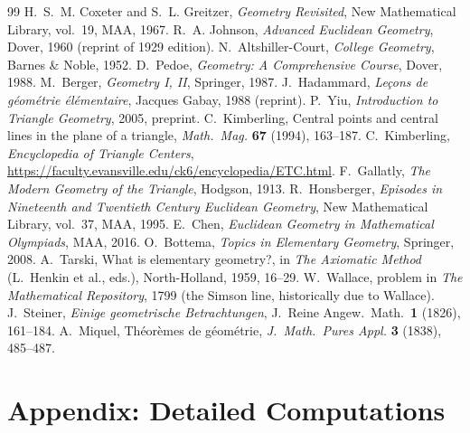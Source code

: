\documentclass[11pt,a4paper]{article}
\theoremstyle{definition}
\begin{document}
\begin{thebibliography}{99}
 H.~S.~M. Coxeter and S.~L. Greitzer, \emph{Geometry Revisited}, New Mathematical Library, vol.~19, MAA, 1967.
 R.~A. Johnson, \emph{Advanced Euclidean Geometry}, Dover, 1960 (reprint of 1929 edition).
 N.~Altshiller-Court, \emph{College Geometry}, Barnes \& Noble, 1952.
 D.~Pedoe, \emph{Geometry: A Comprehensive Course}, Dover, 1988.
 M.~Berger, \emph{Geometry I, II}, Springer, 1987.
 J.~Hadammard, \emph{Le\c{c}ons de g\'eom\'etrie \'el\'ementaire}, Jacques Gabay, 1988 (reprint).
 P.~Yiu, \emph{Introduction to Triangle Geometry}, 2005, preprint.
 C.~Kimberling, Central points and central lines in the plane of a triangle, \emph{Math.\ Mag.} \textbf{67} (1994), 163--187.
 C.~Kimberling, \emph{Encyclopedia of Triangle Centers}, \url{https://faculty.evansville.edu/ck6/encyclopedia/ETC.html}.
 F.~Gallatly, \emph{The Modern Geometry of the Triangle}, Hodgson, 1913.
 R.~Honsberger, \emph{Episodes in Nineteenth and Twentieth Century Euclidean Geometry}, New Mathematical Library, vol.~37, MAA, 1995.
 E.~Chen, \emph{Euclidean Geometry in Mathematical Olympiads}, MAA, 2016.
 O.~Bottema, \emph{Topics in Elementary Geometry}, Springer, 2008.
 A.~Tarski, What is elementary geometry?, in \emph{The Axiomatic Method} (L.~Henkin et al., eds.), North-Holland, 1959, 16--29.
 W.~Wallace, problem in \emph{The Mathematical Repository}, 1799 (the Simson line, historically due to Wallace).
 J.~Steiner, \emph{Einige geometrische Betrachtungen}, J.~Reine Angew.\ Math.\ \textbf{1} (1826), 161--184.
 A.~Miquel, Th\'eor\`emes de g\'eom\'etrie, \emph{J.~Math.\ Pures Appl.} \textbf{3} (1838), 485--487.
\end{thebibliography}

\appendix

\section{Appendix: Detailed Computations}\label{app:computations}
\end{document}
